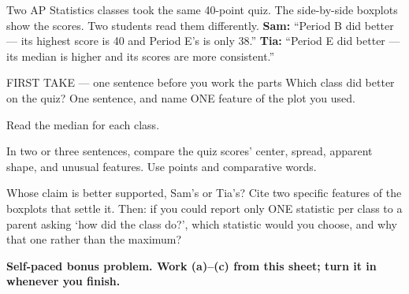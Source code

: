 \documentclass[14pt]{extarticle}
\begin{document}
\pagestyle{empty}


\noindent\begin{minipage}[t]{0.57\linewidth}
\vspace{0pt}
Two AP Statistics classes took the same 40-point quiz. The side-by-side boxplots show the scores. Two students read them differently. \textbf{Sam:} ``Period B did better --- its highest score is 40 and Period E's is only 38.'' \textbf{Tia:} ``Period E did better --- its median is higher and its scores are more consistent.''\par
\end{minipage}\hfill
\begin{minipage}[t]{0.40\linewidth}
\vspace{0pt}
\begin{center}
\end{center}
\end{minipage}

\begin{firsttakebox}{FIRST TAKE --- one sentence before you work the parts}
Which class did better on the quiz? One sentence, and name ONE feature of the plot you used.
\end{firsttakebox}

\begin{description}[leftmargin=1.15in, labelwidth=1in, itemsep=2pt, topsep=2pt]
  \item[\dokbadge{1}~(a)] Read the median for each class.
  \item[\dokbadge{2}~(b)] In two or three sentences, compare the quiz scores' center, spread, apparent shape, and unusual features. Use points and comparative words.
  \item[\dokbadge{3}~(c)] Whose claim is better supported, Sam's or Tia's? Cite two specific features of the boxplots that settle it. Then: if you could report only ONE statistic per class to a parent asking `how did the class do?', which statistic would you choose, and why that one rather than the maximum?
\end{description}

\vfill
\textbf{Self-paced bonus problem. Work (a)--(c) from this sheet; turn it in whenever you finish.}
\end{document}
